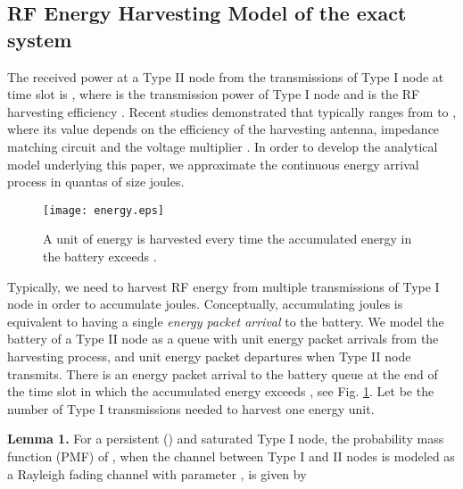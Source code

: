 \documentclass[draftcls,12pt,onecolumn]{IEEEtran}
\begin{document}
\vspace{-0.2in}
\subsection{RF Energy Harvesting Model of the exact system }\label{sec: exact system}
\indent The received power at a Type II node from the transmissions of Type I node at time slot  is , where  is the transmission power of Type I node and  is the RF harvesting efficiency \cite{lu2014survey}. Recent studies demonstrated that  typically ranges from  to , where its value depends on the efficiency of the harvesting antenna, impedance matching circuit and the voltage multiplier \cite{coporation2011rf}. In order to develop the analytical model underlying this paper, we approximate the continuous energy arrival process in quantas of size  joules.  

\begin{figure}[t]
\texttt{[image: energy.eps]}
\centering
\caption{A unit of energy is harvested every time the accumulated energy in the battery exceeds .}\label{fig:energy}
\end{figure}
\indent Typically, we need to harvest RF energy from multiple transmissions of Type I node in order to accumulate  joules. Conceptually, accumulating  joules is equivalent to having a single {\em energy packet arrival} to the battery. We model the battery of a Type II node as a queue with unit energy packet arrivals from the harvesting process, and unit energy packet departures when Type II node transmits. There is an energy packet arrival to the battery queue at the end of the time slot in which the accumulated energy exceeds , see Fig. \ref{fig:energy}. Let  be the number of Type I transmissions needed to harvest one energy unit. 

\indent \textbf{Lemma 1.} For a persistent () and saturated Type I node, the probability mass function (PMF) of , when the channel between Type I and II nodes is modeled as a Rayleigh fading channel with parameter , is given by
\end{document}
